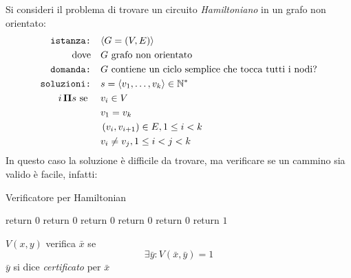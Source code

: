 Si consideri il problema di trovare un circuito \emph{Hamiltoniano} in un grafo non orientato:
\begin{align*}
    \texttt{istanza:} \quad & \langle G=(V,E) \rangle \\
    \text{dove} \quad & G \text{ grafo non orientato} \\
    \texttt{domanda:} \quad & G \text{ contiene un ciclo semplice che tocca tutti i nodi?} \\
    \texttt{soluzioni:} \quad & s=\langle v_1, \dots, v_k \rangle \in \mathbb{N}^* \\
    i \, \bm{\Pi}{} s \text{ se } \quad & 
    v_i \in V \\
    & v_1 = v_k \\
    & \left( v_i, v_{i+1} \right) \in E, 1 \leq i < k \\
    & v_i \neq v_j , 1 \leq i < j < k
\end{align*}
In questo caso la soluzione è difficile da trovare, ma verificare se un cammino sia valido è facile, infatti:
\begin{algorithm}[H]
\caption{Verificatore per Hamiltonian}\label{alg:verifyh}
\begin{algorithmic}[1]
            \State return $0$
        \EndIf
            \State return $0$
        \EndIf
            \State return $0$
        \EndIf
            \State return $0$
        \EndIf
                \State return $0$
            \EndIf
        \EndFor
        \State return $1$
    \EndProcedure
\end{algorithmic}
\end{algorithm}

\begin{definition}
    \label{def:verificatore}
    $V(x,y)$ verifica $\bar{x}$ se 
    \begin{equation*}
        \exists \bar{y} : V( \bar{x}, \bar{y}) = 1
    \end{equation*}
    $\bar{y}$ si dice \emph{certificato} per $\bar{x}$
\end{definition}

